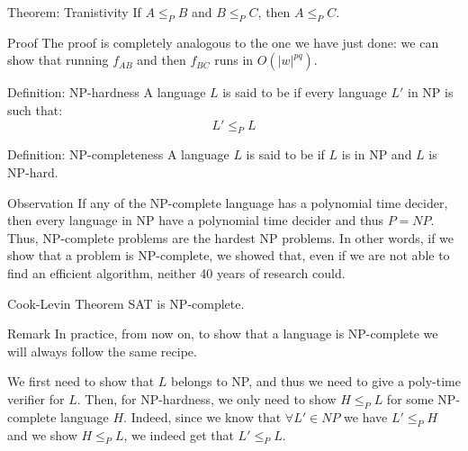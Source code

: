 \documentclass[a4paper]{article}
\begin{document}
\begin{parag}{Theorem: Tranistivity}
    If $A \leq_P B$ and $B \leq_P C$, then $A \leq_P C$.

    \begin{subparag}{Proof}
        The proof is completely analogous to the one we have just done: we can show that running $f_{AB}$ and then $f_{BC}$ runs in $O\left(\left|w\right|^{pq}\right)$.
    \end{subparag}
\end{parag}

\begin{parag}{Definition: NP-hardness}
    A language $L$ is said to be  if every language $L'$ in NP is such that: 
    \[L' \leq_P L\]
\end{parag}


\begin{parag}{Definition: NP-completeness}
    A language $L$ is said to be  if $L$ is in NP and $L$ is NP-hard.
    
    \begin{subparag}{Observation}
        If any of the NP-complete language has a polynomial time decider, then every language in NP have a polynomial time decider and thus $P = NP$. Thus, NP-complete problems are the hardest NP problems. In other words, if we show that a problem is NP-complete, we showed that, even if we are not able to find an efficient algorithm, neither 40 years of research could.
    \end{subparag}
\end{parag}

\begin{parag}{Cook-Levin Theorem}
    SAT is NP-complete.
\end{parag}

\begin{parag}{Remark}
    In practice, from now on, to show that a language is NP-complete we will always follow the same recipe. 

    We first need to show that $L$ belongs to NP, and thus we need to give a poly-time verifier for $L$. Then, for NP-hardness, we only need to show $H \leq_P L$ for some NP-complete language $H$. Indeed, since we know that $\forall L' \in NP$ we have $L' \leq _P H$ and we show $H \leq_P L$, we indeed get that $L' \leq_P L$.
\end{parag}
\end{document}
